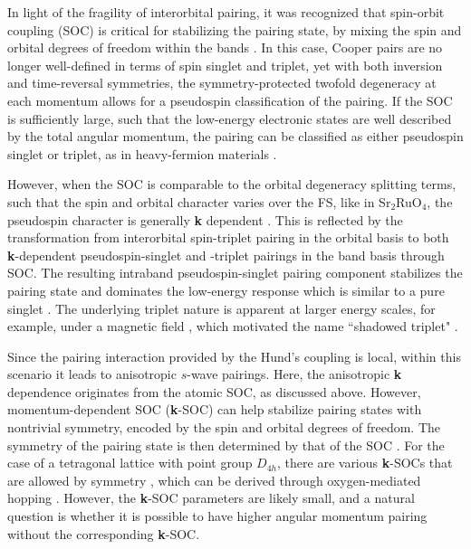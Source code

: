 \documentclass[%
reprint,
superscriptaddress,
 amsmath,amssymb,
 aps,
prb,
nobalancelastpage,
]{revtex4-2}
\begin{document}

In light of the fragility of interorbital pairing, it was recognized that spin-orbit coupling (SOC) is critical for stabilizing the pairing state, by mixing the spin and orbital degrees of freedom within the bands \cite{Puetter2012EPL, vafek2017hund, Cheung2019PRB, Suh2019}. In this case, Cooper pairs are no longer well-defined in terms of spin singlet and triplet, yet with both inversion and time-reversal symmetries, the symmetry-protected twofold degeneracy at each momentum allows for a pseudospin classification of the pairing. If the SOC is sufficiently large, such that the low-energy electronic states are well described by the total angular momentum, the pairing can be classified as either pseudospin singlet or triplet, as in heavy-fermion materials \cite{Joynt2002RMP, Kallin2016}. 

However, when the SOC is comparable to the orbital degeneracy splitting terms, such that the spin and orbital character varies over the FS, like in Sr$_{2}$RuO$_{4}$, the pseudospin character is generally \textbf{k} dependent \cite{Puetter2012EPL,Veenstra2014PRL}. This is reflected by the transformation from interorbital spin-triplet pairing in the orbital basis to both \textbf{k}-dependent pseudospin-singlet and -triplet pairings in the band basis through SOC. The resulting intraband pseudospin-singlet pairing component stabilizes the pairing state and dominates the low-energy response which is similar to a pure singlet \cite{Yu2018PRB,lindquist2019distinct}. The underlying triplet nature is apparent at larger energy scales, for example, under a magnetic field \cite{lindquist2019distinct}, which motivated the name ``shadowed triplet" \cite{clepkens2021}.




Since the pairing interaction provided by the Hund's coupling is local, within this scenario it leads to anisotropic $s$-wave pairings. Here, the anisotropic \textbf{k} dependence originates from the atomic SOC, as discussed above. However, momentum-dependent SOC (\textbf{k}-SOC) can help stabilize pairing states with nontrivial symmetry, encoded by the spin and orbital degrees of freedom. The symmetry of the pairing state is then determined by that of the SOC \cite{Cheung2019PRB, Suh2019, clepkens2021}. For the case of a tetragonal lattice with point group $D_{4h}$, there are various \textbf{k}-SOCs that are allowed by symmetry \cite{Ramires2019PRB}, which can be derived through oxygen-mediated hopping \cite{clepkens2021}. However, the \textbf{k}-SOC parameters are likely small, and a natural question is whether it is possible to have higher angular momentum pairing without the corresponding \textbf{k}-SOC. 
\end{document}
